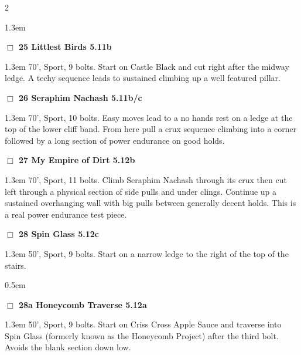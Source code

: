 \begin{multicols}{2}
\begin{adjustwidth}{1.3em}{}
\end{adjustwidth}
\needspace{2em}
\label{rt:Littlest Birds}
\colorbox{RoyalBlue!20}{
\parbox{0.95\linewidth}{
\hspace{-1ex}\textbf{$\Box$
25 Littlest Birds 5.11b  
}}}
\begin{adjustwidth}{1.3em}{}			
70', Sport, 9 bolts. Start on Castle Black and cut right after the midway ledge. A techy sequence leads to sustained climbing up a well featured pillar.
\end{adjustwidth}
\needspace{2em}
\label{rt:Seraphim Nachash}
\colorbox{RoyalBlue!20}{
\parbox{0.95\linewidth}{
\hspace{-1ex}\textbf{$\Box$
26 Seraphim Nachash 5.11b/c  
}}}
\begin{adjustwidth}{1.3em}{}			
70', Sport, 10 bolts. Easy moves lead to a no hands rest on a ledge at the top of the lower cliff band. From here pull a crux sequence climbing into a corner followed by a long section of power endurance on good holds.
\end{adjustwidth}
\needspace{2em}
\label{rt:My Empire of Dirt}
\colorbox{Goldenrod!20}{
\parbox{0.95\linewidth}{
\hspace{-1ex}\textbf{$\Box$
27 My Empire of Dirt 5.12b  
}}}
\begin{adjustwidth}{1.3em}{}			
70', Sport, 11 bolts. Climb Seraphim Nachash through its crux then cut left through a physical section of side pulls and under clings. Continue up a sustained overhanging wall with big pulls between generally decent holds. This is a real power endurance test piece.
\end{adjustwidth}
\needspace{2em}
\label{rt:Spin Glass}
\colorbox{Goldenrod!20}{
\parbox{0.95\linewidth}{
\hspace{-1ex}\textbf{$\Box$
28 Spin Glass 5.12c  
}}}
\begin{adjustwidth}{1.3em}{}			
50', Sport, 9 bolts. Start on a narrow ledge to the right of the top of the stairs.
\end{adjustwidth}
\begin{adjustwidth}{0.5cm}{}				
\needspace{4em}
\needspace{2em}
\label{vr:Honeycomb Traverse}
\colorbox{Goldenrod!20}{
\parbox{0.95\linewidth}{
\hspace{-1ex}\textbf{$\Box$
28a Honeycomb Traverse 5.12a  
}}}
\begin{adjustwidth}{1.3em}{}			
50', Sport, 9 bolts. Start on Criss Cross Apple Sauce and traverse into Spin Glass (formerly known as the Honeycomb Project) after the third bolt. Avoids the blank section down low.

\end{adjustwidth}
\end{adjustwidth}
\end{multicols}
